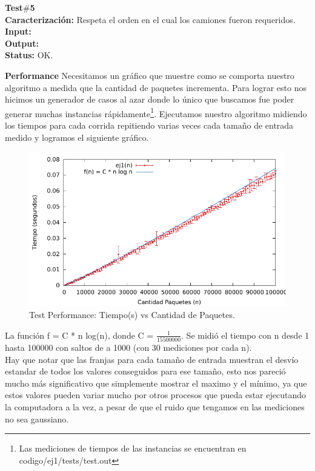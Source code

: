 \noindent\textbf{Test$\#$5}\\
\textbf{Caracterización:} Respeta el orden en el cual los camiones fueron requeridos.\\
\textbf{Input:} \\
\textbf{Output:} \\
\textbf{Status:} OK. \\

\newpage


\textbf{Performance}
Necesitamos un gr\'afico que muestre como se comporta nuestro algoritmo a medida que la cantidad de paquetes incrementa. Para lograr esto nos hicimos un generador de casos al azar donde lo \'unico que buscamos fue poder generar muchas instancias r\'apidamente\footnote{Las mediciones de tiempos de las instancias se encuentran en codigo/ej1/tests/test.out}. Ejecutamos nuestro algoritmo midiendo los tiempos para cada corrida repitiendo varias veces cada tamaño de entrada medido y logramos el siguiente gr\'afico. 



\begin{figure}[H]
\centering
\includegraphics{imgs/ej1-graphic.pdf}
\caption{Test Performance: Tiempo(s) vs Cantidad de Paquetes.}
\end{figure}

La función f = C * n log(n), donde C = $\frac{1}{15500000}$. Se midió el tiempo con n desde 1 hasta 100000 con saltos de a 1000 (con 30 mediciones por cada n).\\
Hay que notar que las franjas para cada tamaño de entrada muestran el desvío estandar de todos los valores conseguidos para ese tamaño, esto nos pareci\'o mucho m\'as significativo que simplemente mostrar el maximo y el m\'inimo, ya que estos valores pueden variar mucho por otros procesos que pueda estar ejecutando la computadora a la vez, a pesar de que el ruido que tengamos en las mediciones no sea gaussiano.


